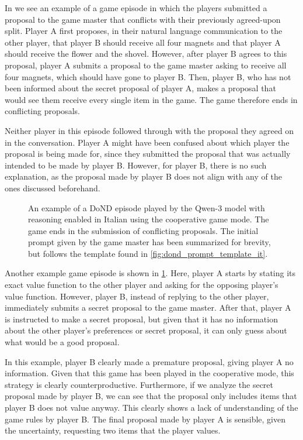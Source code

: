 \documentclass[../main.tex]{subfiles}
\begin{document}
In  we see an example of a game episode in which the players submitted a proposal to the game master that conflicts with their previously agreed-upon split. Player A first proposes, in their natural language communication to the other player, that player B should receive all four magnets and that player A should receive the flower and the shovel. However, after player B agrees to this proposal, player A submits a proposal to the game master asking to receive all four magnets, which should have gone to player B. Then, player B, who has not been informed about the secret proposal of player A, makes a proposal that would see them receive every single item in the game. The game therefore ends in conflicting proposals.

Neither player in this episode followed through with the proposal they agreed on in the conversation. Player A might have been confused about which player the proposal is being made for, since they submitted the proposal that was actually intended to be made by player B. However, for player B, there is no such explanation, as the proposal made by player B does not align with any of the ones discussed beforehand.

\begin{figure}[ht!]
  \centering
  
  \caption{An example of a DoND episode played by the Qwen-3 model with reasoning enabled in Italian using the cooperative game mode. The game ends in the submission of conflicting proposals. The initial prompt given by the game master has been summarized for brevity, but follows the template found in \cref{fig:dond_prompt_template_it}.}
  \label{fig:dond_example_it}
\end{figure}

Another example game episode is shown in \cref{fig:dond_example_it}. Here, player A starts by stating its exact value function to the other player and asking for the opposing player's value function. However, player B, instead of replying to the other player, immediately submits a secret proposal to the game master. After that, player A is instructed to make a secret proposal, but given that it has no information about the other player's preferences or secret proposal, it can only guess about what would be a good proposal.

In this example, player B clearly made a premature proposal, giving player A no information. Given that this game has been played in the cooperative mode, this strategy is clearly counterproductive. Furthermore, if we analyze the secret proposal made by player B, we can see that the proposal only includes items that player B does not value anyway. This clearly shows a lack of understanding of the game rules by player B. The final proposal made by player A is sensible, given the uncertainty, requesting two items that the player values.
\end{document}
